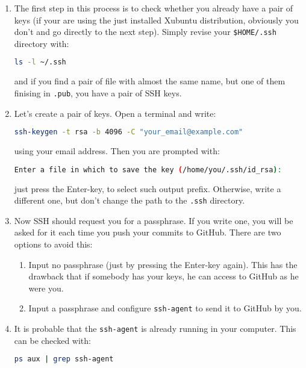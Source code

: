 \begin{enumerate}
\item The first step in this process is to check whether you already
  have a pair of keys (if your are using the just installed Xubuntu
  distribution, obviously you don't and go directly to the next
  step). Simply revise your \texttt{\$HOME/.ssh} directory with:

  \begin{lstlisting}[language=bash]
    ls -l ~/.ssh
  \end{lstlisting}

  and if you find a pair of file with almost the same name, but one of
  them finising in \texttt{.pub}, you have a pair of SSH keys.

\item Let's create a pair of keys. Open a terminal and write:

  \begin{lstlisting}[language=bash]
    ssh-keygen -t rsa -b 4096 -C "your_email@example.com"
  \end{lstlisting}

  using your email address. Then you are prompted with:

  \begin{lstlisting}[language=bash]
    Enter a file in which to save the key (/home/you/.ssh/id_rsa):
  \end{lstlisting}

  just press the Enter-key, to select such output prefix. Otherwise,
  write a different one, but don't change the path to the
  \texttt{.ssh} directory.

\item Now SSH should request you for a passphrase. If you write one,
  you will be asked for it each time you push your commits to
  GitHub. There are two options to avoid this:

  \begin{enumerate}
  \item Input no passphrase (just by pressing the Enter-key
    again). This has the drawback that if somebody has your keys, he
    can access to GitHub as he were you.
  \item Input a passphrase and configure \texttt{ssh-agent} to send it
    to GitHub by you.
  \end{enumerate}

\item It is probable that the \texttt{ssh-agent} is already
  running in your computer. This can be checked with:

  \begin{lstlisting}[language=bash]
    ps aux | grep ssh-agent
  \end{lstlisting}


\end{enumerate}
